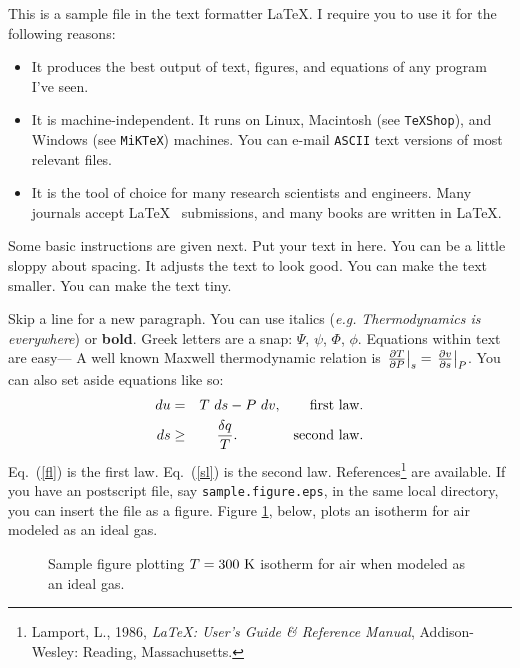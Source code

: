 \documentclass{article}
\begin{document}

\medskip
This is a sample file in the text formatter \LaTeX.
I require you to use it for the following reasons:

\begin{itemize}

\item{It produces the best output of text, figures,
      and equations of any
      program I've seen.}

\item{It is machine-independent. It runs on Linux, Macintosh (see {\tt TeXShop}), and Windows (see {\tt MiKTeX}) machines.
     You can e-mail {\tt ASCII} text versions of most relevant files.}

\item{It is the tool of choice for many research
     scientists and engineers.
     Many journals accept 
     \LaTeX~ submissions, and many books
     are written in \LaTeX.}

\end{itemize}
\medskip
Some basic instructions are given next.
Put your text in here.  You can be a little sloppy    about
spacing.  It adjusts the text to look good.
{\small You can make the text smaller.}
{\tiny You can make the text tiny.}

Skip a line for a new paragraph.   
You can use italics ({\em e.g.} {\em  Thermodynamics is everywhere}) or {\bf bold}.
Greek letters are a snap: $\Psi$, $\psi$,
$\Phi$, $\phi$.  Equations within text are easy---
A well known Maxwell thermodynamic relation is
$\left.{\partial T \over \partial P}\right|_{s} = 
\left.{\partial v \over \partial s}\right|_{P}$.
You can also set aside equations like so:
\begin{eqnarray}
du &=& T\ ds -P\ dv, \qquad \mbox{first law.}\label{fl}\\
ds &\ge& {\delta q \over T}.\qquad  \qquad \mbox{second law.} \label{sl}
\end{eqnarray}
Eq.~(\ref{fl}) is the first law.
Eq.~(\ref{sl}) is the second law.
References\footnote{Lamport, L., 1986, {\em \LaTeX: User's Guide \& Reference Manual},
    Addison-Wesley: Reading, Massachusetts.}
are available. 
If you have an postscript file, say {\tt sample.figure.eps}, in the same local directory,
you can insert the file as a figure.  Figure \ref{sample}, below, plots an isotherm for air modeled as an ideal gas. 
\begin{figure}[ht]
\epsfxsize=2.5in
\centerline{}
\caption{Sample figure plotting $T=300~{\rm K}$ isotherm for air when modeled as an ideal gas.}
\label{sample}
\end{figure}
\end{document}
